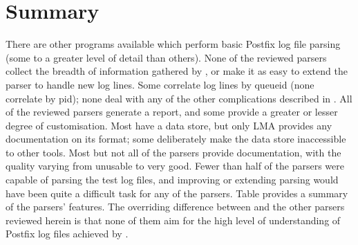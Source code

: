 \section{Summary}

There are other programs available which perform basic Postfix log file
parsing (some to a greater level of detail than others).   None of the
reviewed parsers collect the breadth of information gathered by
\parsername{}, or make it as easy to extend the parser to handle new log
lines.  Some correlate log lines by queueid (none correlate by pid); none
deal with any of the other complications described in
.  All of the reviewed parsers generate a report,
and some provide a greater or lesser degree of customisation.  Most have a
data store, but only \gls{LMA} provides any documentation on its format;
some deliberately make the data store inaccessible to other tools.  Most
but not all of the parsers provide documentation, with the quality varying
from unusable to very good.  Fewer than half of the parsers were capable of
parsing the \numberOFlogFILES{} test log files, and improving or extending
parsing would have been quite a difficult task for any of the parsers.
Table  provides a summary of the
parsers' features.  The overriding difference between \parsername{} and the
other parsers reviewed herein is that none of them aim for the high level
of understanding of Postfix log files achieved by \parsername{}.


